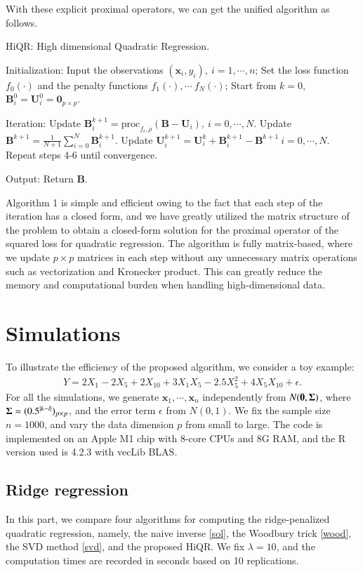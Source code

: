 \documentclass[preprint,authoryear,11pt]{elsarticle}
\def\proc{\mbox{proc}}
\newcommand{\bSig}{\mbox{\boldmath $\Sigma$}}
\newcommand{\bzero}{\mathbf 0}
\newcommand{\B}{\mathbf B}
\newcommand{\x}{\mathbf x}
\newcommand{\aU}{\mathbf U}
\begin{document}
With these explicit proximal operators, we can get the unified algorithm as follows.
 \begin{algorithm}[H]\small 
	\caption{HiQR: High dimensional Quadratic Regression.}
	\begin{algorithmic}[1]
		\item[Initialization:]
		\State  Input the observations $(\x_i,y_i),~i=1,\cdots,n$;
		\State  Set the loss function $f_0(\cdot)$ and the penalty functions $f_1(\cdot),\cdots~f_N(\cdot)$;
		\State  Start from $k=0$, $\B^{0}_i=\aU_i^0=\bzero_{p \times p}$.
		\item[Iteration:] 	
		\State  Update $\B^{k+1}_i=\proc_{f_i,\rho}(\B-\aU_i),~i=0,\cdots,N$.
		\State Update $\B^{k+1}=\frac{1}{N+1}\sum_{i=0}^N \B^{k+1}_i$.
		\State Update $\aU_i^{k+1}=\aU_i^k+\B_i^{k+1}-\B^{k+1}~i=0,\cdots,N$.
		\State 	Repeat steps 4-6 until convergence. 		
		\item[Output:] Return $\B$.
	\end{algorithmic}
\end{algorithm}
Algorithm 1 is simple and efficient owing to the fact that each step of the iteration has a closed form, and we have greatly utilized the matrix structure of the problem to obtain a closed-form solution for the proximal operator of the squared loss for quadratic regression. The algorithm is fully matrix-based, where we update $p \times p$ matrices in each step without any unnecessary matrix operations such as vectorization and Kronecker product. This can greatly reduce the memory and computational burden when handling high-dimensional data.
 



\section{Simulations}
To illustrate the efficiency of the proposed algorithm, we consider a toy example: 
\begin{align*}
Y=2X_1-2X_5+2X_{10}+3X_1X_5-2.5X_5^2+4X_5X_{10}+\epsilon.	
\end{align*}
For all the simulations, we generate $\x_1,\cdots,\x_n$ independently from $N(\bzero,\bSig)$, where $\bSig=(0.5^{|k-l|})_{p \times p}$, and the error term $\epsilon$ from $N(0,1)$.  We fix the sample size $n=1000$, and vary the data dimension $p$ from small to large.  The code is implemented on an Apple M1 chip with 8-core CPUs and 8G RAM, and the R version used is 4.2.3 with vecLib BLAS.

\subsection{Ridge regression}
In this part, we compare four algorithms for computing the ridge-penalized quadratic regression, namely, the naive inverse \eqref{sol}, the Woodbury trick \eqref{wood}, the SVD method \eqref{svd}, and the proposed HiQR. We fix $\lambda=10$, and the computation times are recorded in seconds based on 10 replications.
\end{document}
